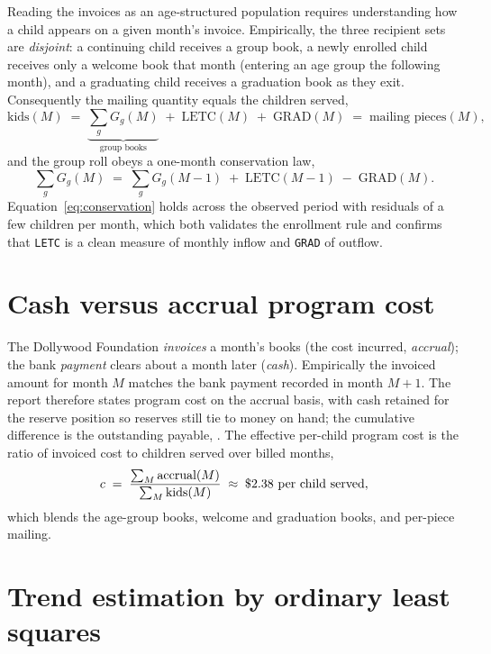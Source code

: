 Reading the invoices as an age-structured population requires understanding how a
child appears on a given month's invoice. Empirically, the three recipient sets are
\emph{disjoint}: a continuing child receives a group book, a newly enrolled child
receives only a welcome book that month (entering an age group the following month),
and a graduating child receives a graduation book as they exit. Consequently the
mailing quantity equals the children served,
\begin{equation}
\text{kids}(M) \;=\; \underbrace{\textstyle\sum_{g} G_g(M)}_{\text{group books}}
              \;+\; \text{LETC}(M) \;+\; \text{GRAD}(M)
              \;=\; \text{mailing pieces}(M),
\end{equation}
and the group roll obeys a one-month conservation law,
\begin{equation}
\sum_g G_g(M) \;=\; \sum_g G_g(M-1) \;+\; \text{LETC}(M-1) \;-\; \text{GRAD}(M).
\label{eq:conservation}
\end{equation}
Equation~\eqref{eq:conservation} holds across the observed period with residuals of
a few children per month, which both validates the enrollment rule and confirms that
\texttt{LETC} is a clean measure of monthly inflow and \texttt{GRAD} of outflow.

\section{Cash versus accrual program cost}

The Dollywood Foundation \emph{invoices} a month's books (the cost incurred,
\emph{accrual}); the bank \emph{payment} clears about a month later (\emph{cash}).
Empirically the invoiced amount for month $M$ matches the bank payment recorded in
month $M\!+\!1$. The report therefore states program cost on the accrual basis,
with cash retained for the reserve position so reserves still tie to money on hand;
the cumulative difference is the outstanding payable, \ilsaProgramPayable{}. The
effective per-child program cost is the ratio of invoiced cost to children served
over billed months,
\begin{equation}
c \;=\; \frac{\sum_M \text{accrual}(M)}{\sum_M \text{kids}(M)} \;\approx\; \$2.38{}\ \text{per child served},
\end{equation}
which blends the age-group books, welcome and graduation books, and per-piece
mailing.

\section{Trend estimation by ordinary least squares}


